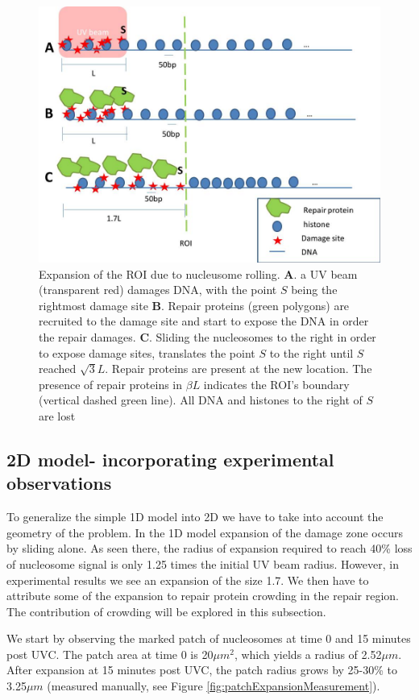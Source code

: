 \documentclass[12pt]{report}
\begin{document}
   \begin{figure}
   	\centering
   	\includegraphics[width=0.7\linewidth]{Images/SlidingModel/histoneSlidingMulti}
   	\caption{Expansion of the ROI due to nucleusome rolling. \textbf{A}. a UV beam (transparent red) damages DNA, with the point $S$ being the rightmost damage site \textbf{B}. Repair proteins (green polygons) are recruited to the damage site and start to expose the DNA in order the repair damages. \textbf{C}. Sliding the nucleosomes to the right in order to expose damage sites, translates the point $S$ to the right until $S$ reached $\sqrt{3}L$. Repair proteins are present at the new location. The presence of repair proteins in $\beta L$ indicates the ROI's boundary (vertical dashed green line). All DNA and histones to the right of $S$ are lost}
   	\label{fig:histoneSlidingMulti}
   \end{figure}
   
\subsection{2D model- incorporating experimental observations}\label{subsection:2dModel}
To generalize the simple 1D model into 2D we have to take into account the geometry of the problem. In the 1D model expansion of the damage zone occurs by sliding alone. As seen there, the radius of expansion required to reach 40\% loss of nucleosome signal is only 1.25 times the initial UV beam radius. However, in experimental results we see an expansion of the size 1.7. We then have to attribute some of the expansion to repair protein crowding in the repair region. The contribution of crowding will be explored in this subsection. 

We start by observing the marked patch of nucleosomes at time 0 and 15 minutes post UVC. The patch area at time 0 is 20$\mu m^2$, which yields a radius of 2.52$\mu m$. After expansion at 15 minutes post UVC, the patch radius grows by 25-30\% to 3.25$\mu m$ (measured manually, see Figure \ref{fig:patchExpansionMeasurement}). 
\end{document}
